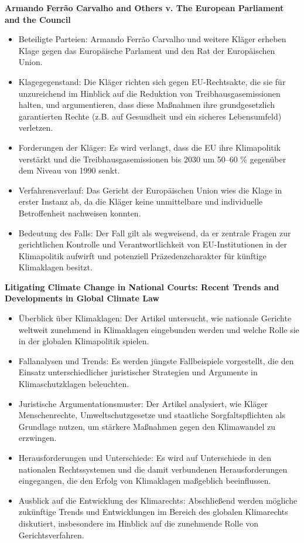\documentclass[a4paper, 12pt]{article} %
\begin{document}
 \textbf{\cite{ArmandoFerraoCarvalho} Armando {{Ferrão Carvalho}} and {{Others}} v. {{The European Parliament}} and the {{Council}}}

 \begin{itemize}
   \item Beteiligte Parteien: Armando Ferrão Carvalho und weitere Kläger erheben Klage gegen das Europäische Parlament und den Rat der Europäischen Union.
   \item Klagegegenstand: Die Kläger richten sich gegen EU-Rechtsakte, die sie für unzureichend im Hinblick auf die Reduktion von Treibhausgasemissionen halten, und argumentieren, dass diese Maßnahmen ihre grundgesetzlich garantierten Rechte (z.B. auf Gesundheit und ein sicheres Lebensumfeld) verletzen.
   \item Forderungen der Kläger: Es wird verlangt, dass die EU ihre Klimapolitik verstärkt und die Treibhausgasemissionen bis 2030 um 50–60 \% gegenüber dem Niveau von 1990 senkt.
   \item Verfahrensverlauf: Das Gericht der Europäischen Union wies die Klage in erster Instanz ab, da die Kläger keine unmittelbare und individuelle Betroffenheit nachweisen konnten.
   \item Bedeutung des Falls: Der Fall gilt als wegweisend, da er zentrale Fragen zur gerichtlichen Kontrolle und Verantwortlichkeit von EU-Institutionen in der Klimapolitik aufwirft und potenziell Präzedenzcharakter für künftige Klimaklagen besitzt.
 \end{itemize}

 \textbf{\cite{bandaLitigatingClimateChange2017} Litigating {{Climate Change}} in {{National Courts}}: {{Recent Trends}} and {{Developments}} in {{Global Climate Law}}}
 \begin{itemize}
    \item Überblick über Klimaklagen: Der Artikel untersucht, wie nationale Gerichte weltweit zunehmend in Klimaklagen eingebunden werden und welche Rolle sie in der globalen Klimapolitik spielen.
    \item Fallanalysen und Trends: Es werden jüngste Fallbeispiele vorgestellt, die den Einsatz unterschiedlicher juristischer Strategien und Argumente in Klimaschutzklagen beleuchten.
    \item Juristische Argumentationsmuster:  Der Artikel analysiert, wie Kläger Menschenrechte, Umweltschutzgesetze und staatliche Sorgfaltspflichten als Grundlage nutzen, um stärkere Maßnahmen gegen den Klimawandel zu erzwingen.
    \item Herausforderungen und Unterschiede: Es wird auf Unterschiede in den nationalen Rechtssystemen und die damit verbundenen Herausforderungen eingegangen, die den Erfolg von Klimaklagen maßgeblich beeinflussen.
    \item Ausblick auf die Entwicklung des Klimarechts: Abschließend werden mögliche zukünftige Trends und Entwicklungen im Bereich des globalen Klimarechts diskutiert, insbesondere im Hinblick auf die zunehmende Rolle von Gerichtsverfahren.
 \end{itemize}
\end{document}
